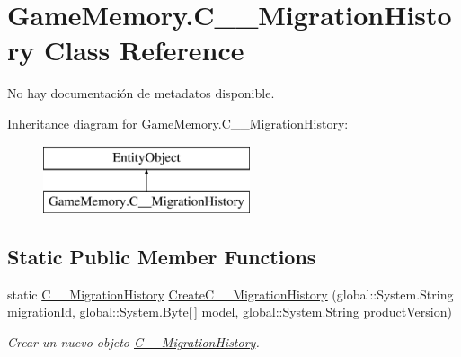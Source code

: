 \hypertarget{class_game_memory_1_1_c_____migration_history}{\section{Game\-Memory.\-C\-\_\-\-\_\-\-Migration\-History Class Reference}
\label{class_game_memory_1_1_c_____migration_history}
}


No hay documentación de metadatos disponible.  


Inheritance diagram for Game\-Memory.\-C\-\_\-\-\_\-\-Migration\-History\-:\begin{figure}[H]
\begin{center}
\leavevmode
\includegraphics[height=2.000000cm]{class_game_memory_1_1_c_____migration_history}
\end{center}
\end{figure}
\subsection*{Static Public Member Functions}
\begin{DoxyCompactItemize}
\item 
static \hyperlink{class_game_memory_1_1_c_____migration_history}{C\-\_\-\-\_\-\-Migration\-History} \hyperlink{class_game_memory_1_1_c_____migration_history_a8c48f47af87e55bad0a9084d92b4b977}{Create\-C\-\_\-\-\_\-\-Migration\-History} (global\-::\-System.\-String migration\-Id, global\-::\-System.\-Byte\mbox{[}$\,$\mbox{]} model, global\-::\-System.\-String product\-Version)
\begin{DoxyCompactList}\small\item\em Crear un nuevo objeto \hyperlink{class_game_memory_1_1_c_____migration_history}{C\-\_\-\-\_\-\-Migration\-History}. \end{DoxyCompactList}\end{DoxyCompactItemize}
